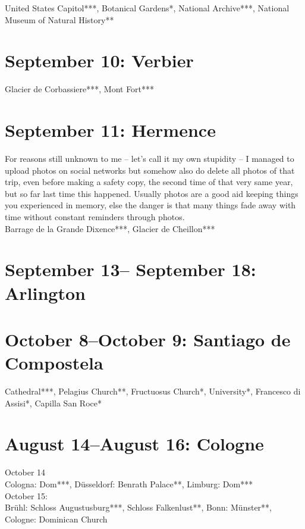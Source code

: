 United States Capitol***, Botanical Gardens*, National Archive***, National Museum of Natural History**

\section{September 10: Verbier}
\label{Verbier2018}

Glacier de Corbassiere***, Mont Fort***

\section{September 11: Hermence}
\label{GrandeDixence2016}

For reasons still unknown to me -- let's call it my own stupidity -- I managed to upload photos on social networks but somehow also do delete all photos of that trip, even before making a safety copy, the second time of that very same year, but so far last time this happened. Usually photos are a good aid keeping things you experienced in memory, else the danger is that many things fade away with time without constant reminders through photos.\\

Barrage de la Grande Dixence***, Glacier de Cheillon***

\section{September 13-- September 18: Arlington}
\label{Arlington2016}

\section{October 8--October 9: Santiago de Compostela}
\label{Santiago2016}

Cathedral***, Pelagius Church**, Fructuosus Church*, University*, Francesco di Assisi*, Capilla San Roce*

\section{August 14--August 16: Cologne}
\label{Cologne2016}

October 14\\
Cologna: Dom***, D\"usseldorf: Benrath Palace**, Limburg: Dom***\\

October 15:\\
Br\"uhl: Schloss Augustusburg***, Schloss Falkenlust**, Bonn: M\"unster**, Cologne: Dominican Church

